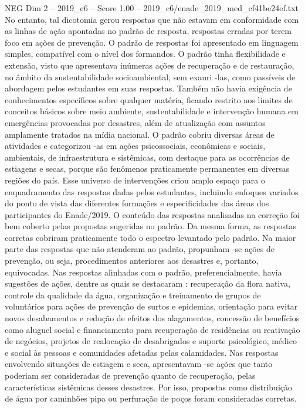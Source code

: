 \begin{textsample}{NEG Dim 2 – 2019\_c6 – Score 1.00 – 2019\_c6/enade\_2019\_med\_cf41be24ef.txt}
No entanto, tal dicotomia gerou respostas que não estavam em conformidade com as linhas de ação apontadas no padrão de resposta, respostas erradas por terem foco em ações de prevenção.
O padrão de respostas foi apresentado em linguagem simples, compatível com o nível dos formandos.
O padrão tinha flexibilidade e extensão, visto que apresentava inúmeras ações de recuperação e de restauração, no âmbito da sustentabilidade socioambiental, sem exauri -las, como passíveis de abordagem pelos estudantes em suas respostas.
Também não havia exigência de conhecimentos específicos sobre qualquer matéria, ficando restrito aos limites de conceitos básicos sobre meio ambiente, sustentabilidade e intervenção humana em emergências provocadas por desastres, além de atualização com assuntos amplamente tratados na mídia nacional.
O padrão cobriu diversas áreas de atividades e categorizou -as em ações psicossociais, econômicas e sociais, ambientais, de infraestrutura e sistêmicas, com destaque para as ocorrências de estiagens e secas, porque são fenômenos praticamente permanentes em diversas regiões do país.
Esse universo de intervenções criou amplo espaço para o enquadramento das respostas dadas pelos estudantes, incluindo enfoques variados do ponto de vista das diferentes formações e especificidades das áreas dos participantes do Enade/2019.
O conteúdo das respostas analisadas na correção foi bem coberto pelas propostas sugeridas no padrão.
Da mesma forma, as respostas corretas cobriram praticamente todo o espectro levantado pelo padrão.
Na maior parte das respostas que não atenderam ao padrão, propunham -se ações de prevenção, ou seja, procedimentos anteriores aos desastres e, portanto, equivocadas.
Nas respostas alinhadas com o padrão, preferencialmente, havia sugestões de ações, dentre as quais se destacaram : recuperação da flora nativa, controle da qualidade da água, organização e treinamento de grupos de voluntários para ações de prevenção de surtos e epidemias, orientação para evitar novos desabamentos e redução de efeitos dos alagamentos, concessão de benefícios como aluguel social e financiamento para recuperação de residências ou reativação de negócios, projetos de realocação de desabrigados e suporte psicológico, médico e social às pessoas e comunidades afetadas pelas calamidades.
Nas respostas envolvendo situações de estiagem e seca, apresentavam -se ações que tanto poderiam ser consideradas de prevenção quanto de recuperação, pelas características sistêmicas desses desastres.
Por isso, propostas como distribuição de água por caminhões pipa ou perfuração de poços foram consideradas corretas.

\end{textsample}
